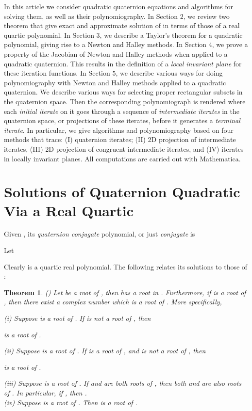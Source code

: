 \documentclass{article}
\newtheorem{thm}{Theorem}
\theoremstyle{definition}
\begin{document}
In this article we consider quadratic quaternion equations and algorithms for solving them, as well as their polynomiography.  In Section 2, we review two theorem that give exact and approximate solution of  in terms of those of a real quartic polynomial. In Section 3, we describe a Taylor's theorem for a quadratic polynomial, giving rise to a Newton and Halley methods. In Section 4, we prove a property of the Jacobian of Newton and Halley methods when applied to a quadratic quaternion. This results in the definition of a {\it local invariant plane} for these iteration functions. In Section 5, we describe various ways for doing polynomiography with Newton and Halley methods applied to a quadratic quaternion. We describe various ways for selecting proper rectangular subsets in the quaternion space. Then the corresponding polynomiograph is rendered where each {\it initial iterate} on it goes through a sequence of {\it intermediate iterates} in the quaternion space, or projections of these iterates, before it generates a {\it terminal iterate}. In particular, we give algorithms and polynomiography based on four methods that trace: (I) quaternion iterates; (II) 2D projection of intermediate iterates, (III) 2D
projection of congruent intermediate iterates, and (IV)  iterates in locally invariant planes. All computations are carried out with Mathematica.


\section{Solutions of Quaternion Quadratic Via a Real Quartic} Given , its {\it quaternion conjugate} polynomial, or just {\it conjugate} is


Let


Clearly  is a quartic real polynomial. The
following relates its solutions to those of :

\begin{thm} \label{thmFx} {\rm (\cite{kalQ})} Let  be a root of , then  has a root in .
Furthermore, if  is a root of , then there exist a complex number  which is a root of . More specifically,

(i) Suppose    is a root of
.  If  is not a root of , then

is a root of .

(ii) Suppose  is a root of
. If  is a root of , and  is not a root of , then

is a root of .

(iii) Suppose  is a root of . If   and  are both roots of ,  then both  and  are also roots of . In particular, if , then .\\

(iv) Suppose 
is a root of . Then  is a root of . 
\end{thm}
\end{document}
